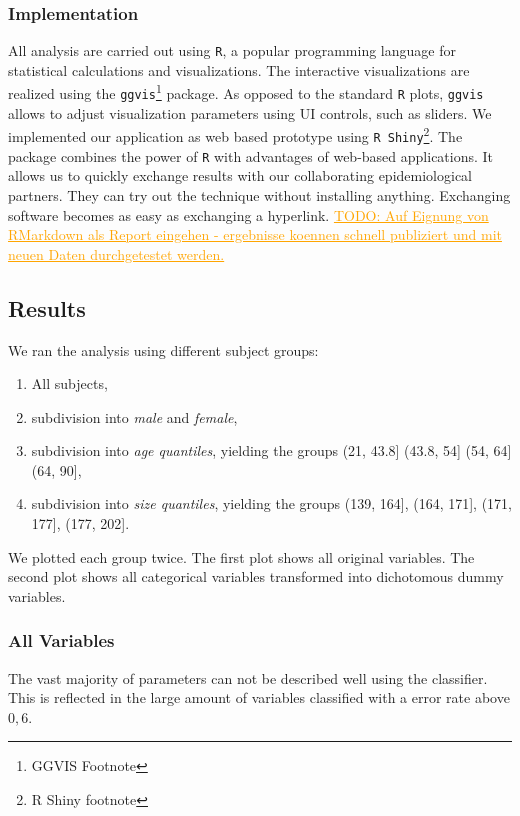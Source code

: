 \documentclass[a4paper,twoside]{style/article}
\newcommand{\com}[1]{\textcolor{orange}{\uline{#1}}}
\begin{document}
\subsubsection{Implementation}
All analysis are carried out using \texttt{R}, a popular programming language for statistical calculations and visualizations.
The interactive visualizations are realized using the \texttt{ggvis}\footnote{GGVIS Footnote} package.
As opposed to the standard \texttt{R} plots, \texttt{ggvis} allows to adjust visualization parameters using UI controls, such as sliders.
We implemented our application as web based prototype using \texttt{R Shiny}\footnote{R Shiny footnote}.
The package combines the power of \texttt{R} with advantages of web-based applications.
It allows us to quickly exchange results with our collaborating epidemiological partners.
They can try out the technique without installing anything.
Exchanging software becomes as easy as exchanging a hyperlink.
\com{TODO: Auf Eignung von RMarkdown als Report eingehen - ergebnisse koennen schnell publiziert und mit neuen Daten durchgetestet werden.}
\subsection{Results}
We ran the analysis using different subject groups:
\begin{enumerate}
	\item All subjects,
	\item subdivision into \emph{male} and \emph{female},
	\item subdivision into \emph{age quantiles}, yielding the groups (21, 43.8] (43.8, 54] (54, 64] (64, 90],
	\item subdivision into \emph{size quantiles}, yielding the groups (139, 164], (164, 171], (171, 177], (177, 202].
\end{enumerate}
We plotted each group twice.
The first plot shows all original variables.
The second plot shows all categorical variables transformed into dichotomous dummy variables.

\subsubsection{All Variables}
The vast majority of parameters can not be described well using the classifier.
This is reflected in the large amount of variables classified with a error rate above $0,6$.
\end{document}
